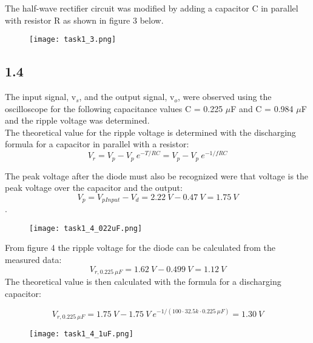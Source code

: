     The half-wave rectifier circuit was modified by adding a capacitor C in parallel with resistor R as shown in figure 3 below.

    \begin{figure}[h!]
        \centering
        \texttt{[image: task1\_3.png]}
    \end{figure}

\subsection*{1.4}
    
    The input signal, v$_s$, and the output signal, v$_o$, were observed using the oscilloscope for the following capacitance values C = 0.225 $\mu$F and C = 0.984 $\mu$F and the ripple voltage was determined.\\
    
    The theoretical value for the ripple voltage is determined with the discharging formula for a capacitor in parallel with a resistor:
    $$ V_r = V_p - V_p \ e^{-T/RC} =  V_p - V_p \ e^{-1/fRC}$$ 
    
    The peak voltage after the diode must also be recognized were that voltage is the peak voltage over the capacitor and the output:
     $$ V_p = V_{pInput} - V_d = 2.22 \ V - 0.47 \ V = 1.75 \ V$$.
    
    \begin{figure}[h!]
        \centering
        \texttt{[image: task1\_4\_022uF.png]}
    \end{figure}
    
    From figure 4 the ripple voltage for the diode can be calculated from the measured data: $$ V_{r,0.225 \ \mu F} = 1.62 \ V - 0.499 \ V = 1.12 \ V $$
     The theoretical value is then calculated with the formula for a discharging capacitor:
    
     $$ V_{r,0.225 \ \mu F} = 1.75 \ V - 1.75 \ V \ e^{-1/(100 \cdot 32.5k \cdot 0.225 \ \mu F)} = 1.30 \ V $$

    \begin{figure}[h!]
        \centering
        \texttt{[image: task1\_4\_1uF.png]}
    \end{figure}
    
